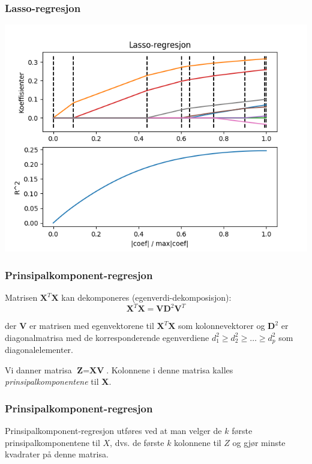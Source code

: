 \documentclass[aspectratio=169]{beamer}
\begin{document}
\begin{frame}
  \frametitle{Lasso-regresjon}
  \begin{center}
    \includegraphics[height=0.8\textheight]{lasso.png}
  \end{center}
\end{frame}

\begin{frame}
  \frametitle{Prinsipalkomponent-regresjon}

  Matrisen \(\textbf{X}^T \textbf{X}\) kan dekomponeres (egenverdi-dekomposisjon):
  \begin{equation}
    \textbf{X}^T\textbf{X} = \textbf{VD}^2\textbf{V}^T
  \end{equation}

  der \(\textbf{V}\) er matrisen med egenvektorene til \(\textbf{X}^T\textbf{X}\) som kolonnevektorer og \(\textbf{D}^2\) er diagonalmatrisa med de korresponderende egenverdiene \(d_1^2 \geq d_2^2 \geq \dots \geq d_p^2\) som diagonalelementer.

  \pause

  Vi danner matrisa \(\textbf{Z} = \textbf{X}\textbf{V}\). Kolonnene i denne matrisa kalles \emph{prinsipalkomponentene} til \textbf{X}.

\end{frame}

\begin{frame}
  \frametitle{Prinsipalkomponent-regresjon}

  Prinsipalkomponent-regresjon utføres ved at man velger de \(k\) første prinsipalkomponentene til \(X\), dvs. de første \(k\) kolonnene til \(Z\) og gjør minste kvadrater på denne matrisa.
\end{frame}
\end{document}
